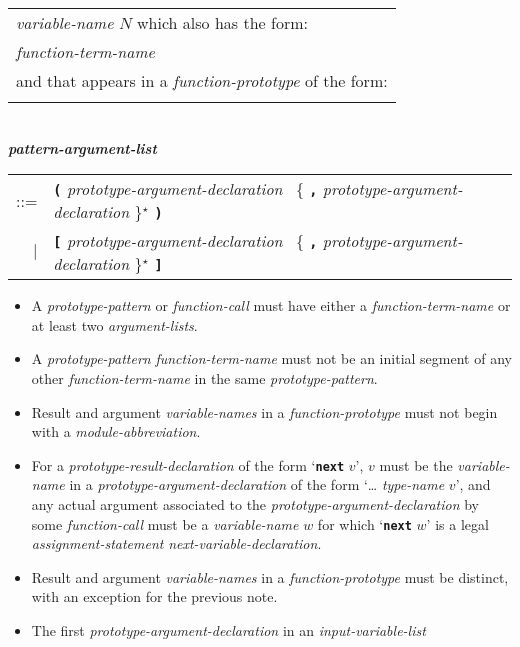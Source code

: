 \documentclass[12pt]{article}
\newcommand{\TT}[1]{{\tt \bfseries #1}}
\newcommand{\STAR}{{\Large $^\star$}}
\newcommand{\QMARK}{{$^{\,\mbox{\footnotesize ?}}$}}
\newcommand{\emkey}[1]{{\em \bfseries #1}}
\newenvironment{indpar}[1][0.3in]%
	{\begin{list}{}%
		     {\setlength{\itemsep}{0in}%
		      \setlength{\topsep}{0in}%
		      \setlength{\parsep}{1ex}%
		      \setlength{\labelwidth}{#1}%
		      \setlength{\leftmargin}{#1}%
		      \addtolength{\leftmargin}{\labelsep}}%
	 \item}%
	{\end{list}}
\begin{document}
\begin{indpar}[0.1in]
\begin{tabular}[t]{@{}p{5in}@{}}
    {\em variable-name} $N$ which also has the form: \\
    \hspace*{1in}{\em module-abbreviation}\QMARK{} {\em function-term-name} \\
    and that appears in a {\em function-prototype} of the form: \\
    \hspace*{1in}{\tt function $N$ = \ldots}
    \end{tabular}
\\[0.5ex]
\emkey{pattern-argument-list}\label{PATTERN-ARGUMENT-LIST} \\
\hspace*{0.5in}
    \begin{tabular}[t]{@{}rl}
    ::= & \TT{(} {\em prototype-argument-declaration}~
	     \{ \TT{,} {\em prototype-argument-declaration} \}\STAR{} \TT{)} \\
    $|$ & \TT{[} {\em prototype-argument-declaration}~
	     \{ \TT{,} {\em prototype-argument-declaration} \}\STAR{} \TT{]} \\
    \end{tabular}
\begin{itemize}\label{FUNCTION-DECLARATION-RULES}
\item
A {\em prototype-pattern} or {\em function-call}
must have either a {\em function-term-name}
or at least two {\em argu\-ment-lists}.
\item
A {\em prototype-pattern} {\em function-term-name} must not be
an initial segment of any other {\em function-term-name}
in the same {\em prototype-pattern}.
\item
Result and argument {\em variable-names}
in a {\em function-prototype} must not begin with a {\em module-abbreviation}.
\item
\label{PROTOTYPE-NEXT-RESULT}
For a {\em prototype-result-declaration} of the form `\TT{next} $v$',
$v$ must be the {\em vari\-able-name} in a {\em prototype-argument-declaration}
of the form `\dots{} {\em type-name} $v$', and
any actual argument associated to the {\em prototype-argument-declaration}
by some {\em function-call}
must be a {\em variable-name} $w$ for which `\TT{next} $w$' is a legal
{\em assignment-statement} {\em next-variable-declaration}.
\item
Result and argument {\em variable-names}
in a {\em function-prototype} must
be distinct, with an exception for the previous note.
\item
The first {\em prototype-argument-declaration} in an {\em input-variable-list}

\end{itemize}
\end{indpar}
\end{document}
